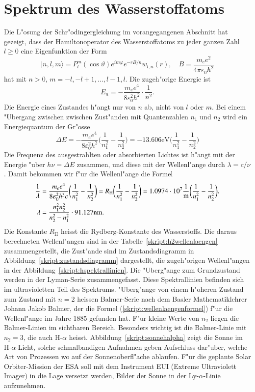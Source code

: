 \section{Spektrum des Wasserstoffatoms}
Die L"osung der Schr"odingergleichung im vorangegangenen Abschnitt
hat gezeigt, dass der Hamiltonoperator des Wasserstoffatoms zu jeder ganzen
Zahl $l\ge 0$ eine Eigenfunktion der Form
\[
|n,l,m\rangle
=
P_l^m(\cos\vartheta) e^{im\varphi}e^{-rB/n}w_{l,n}(r)
,\quad
B=\frac{m_ee^2}{4\pi\varepsilon_0\hbar^2}
\]
hat mit $n>0$, $m=-l,-l+1,\dots,l-1,l$.
Die zugeh"orige Energie ist
\[
E_n=-\frac{m_ee^4}{8\varepsilon_0^2h^2}\cdot \frac1{n^2}.
\]
Die Energie eines Zustandes h"angt nur von $n$ ab, nicht von $l$ oder $m$.
Bei einem "Ubergang zwischen zwischen Zust"anden mit Quantenzahlen $n_1$ und
$n_2$ wird ein Energiequantum der Gr"osse
\begin{equation}
\Delta E
=
-\frac{m_ee^4}{8\varepsilon_0^2h^2}
\biggl(
\frac{1}{n_1^2}
-
\frac{1}{n_2^2}
\biggr)
=
-13.606\text{eV}
\biggl(
\frac{1}{n_1^2}
-
\frac{1}{n_2^2}
\biggr)
\end{equation}
Die Frequenz des ausgestrahlten oder absorbierten Lichtes ist h"angt
mit der Energie "uber $h\nu=\Delta E$ zusammen, und diese mit der
Wellenl"ange durch $\lambda = c/\nu$.
Damit bekommen wir f"ur die Wellenl"ange die Formel
\begin{align}
\frac{1}{\lambda}
&=
\frac{m_ee^4}{8\varepsilon_0^2h^3c}
\biggl(
\frac{1}{n_1^2}
-
\frac{1}{n_2^2}
\biggr)
=
R_{\text{H}}
\biggl(
\frac{1}{n_1^2}
-
\frac{1}{n_2^2}
\biggr)
=
1.0974\cdot 10^7\frac1{\text{m}}
\biggl(
\frac{1}{n_1^2}
-
\frac{1}{n_2^2}
\biggr).
\notag
\\
\lambda
&=
\frac{n_1^2n_2^2}{n_2^2-n_1^2}
\cdot
91.127\text{nm}.
\label{skript:wellenlaengenformel}
\end{align}
Die Konstante $R_{\text{H}}$ heisst die Rydberg-Konstante des
Wasserstoffs.
Die daraus berechneten Wellenl"angen sind in der
Tabelle~\ref{skript:h2wellenlaengen} zusammengestellt, die
Zust"ande sind im Zustandsdiagramm in Abbildung~\ref{skript:zustandsdiagramm}
dargestellt, die zugeh"origen Wellenl"angen in der
Abbildung~\ref{skript:hspektrallinien}.
Die "Uberg"ange zum Grundzustand werden in der Lyman-Serie zusammengefasst.
Diese Spektrallinien befinden sich im ultravioletten Teil des Spektrums.
"Uberg"ange von einem h"oheren Zustand zum Zustand mit $n=2$ 
heissen Balmer-Serie nach dem Basler Mathematiklehrer Johann Jakob Balmer,
der die Formel (\ref{skript:wellenlaengenformel}) f"ur die Wellenl"ange 
im Jahre 1885 gefunden hat.
F"ur kleine Werte von $n_2$ liegen die Balmer-Linien im sichtbaren Bereich.
Besonders wichtig ist die Balmer-Linie mit $n_2=3$, die auch H-$\alpha$
heisst.
Abbildung~\ref{skript:sonnehalpha} zeigt die Sonne im H-$\alpha$-Licht,
solche schmalbandigen Aufnahmen geben Aufschluss dar"uber, welche Art von
Prozessen wo auf der Sonnenoberfl"ache ablaufen.
F"ur die geplante Solar Orbiter-Mission der ESA soll mit dem Instrument
EUI (Extreme Ultraviolett Imager) in die Lage versetzt werden, Bilder
der Sonne in der Ly-$\alpha$-Linie aufzunehmen.

